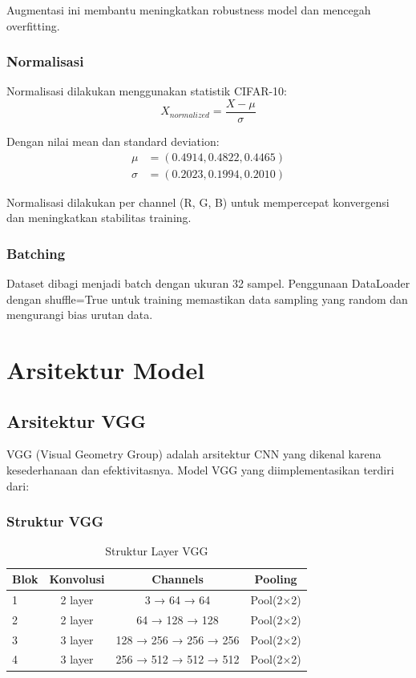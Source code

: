\documentclass[12pt,a4paper]{report}
\begin{document}
Augmentasi ini membantu meningkatkan robustness model dan mencegah overfitting.

\subsection{Normalisasi}

Normalisasi dilakukan menggunakan statistik CIFAR-10:
\begin{equation}
    X_{normalized} = \frac{X - \mu}{\sigma}
\end{equation}

Dengan nilai mean dan standard deviation:
\begin{align}
    \mu &= (0.4914, 0.4822, 0.4465) \\
    \sigma &= (0.2023, 0.1994, 0.2010)
\end{align}

Normalisasi dilakukan per channel (R, G, B) untuk mempercepat konvergensi dan meningkatkan stabilitas training.

\subsection{Batching}

Dataset dibagi menjadi batch dengan ukuran 32 sampel. Penggunaan DataLoader dengan shuffle=True untuk training memastikan data sampling yang random dan mengurangi bias urutan data.

\chapter{Arsitektur Model}

\section{Arsitektur VGG}

VGG (Visual Geometry Group) adalah arsitektur CNN yang dikenal karena kesederhanaan dan efektivitasnya. Model VGG yang diimplementasikan terdiri dari:

\subsection{Struktur VGG}

\begin{table}[H]
\centering
\caption{Struktur Layer VGG}
\begin{tabular}{|l|c|c|c|}
\hline
\textbf{Blok} & \textbf{Konvolusi} & \textbf{Channels} & \textbf{Pooling} \\
\hline
1 & 2 layer & 3 → 64 → 64 & Pool(2×2) \\
\hline
2 & 2 layer & 64 → 128 → 128 & Pool(2×2) \\
\hline
3 & 3 layer & 128 → 256 → 256 → 256 & Pool(2×2) \\
\hline
4 & 3 layer & 256 → 512 → 512 → 512 & Pool(2×2) \\
\hline
\end{tabular}
\end{table}
\end{document}
